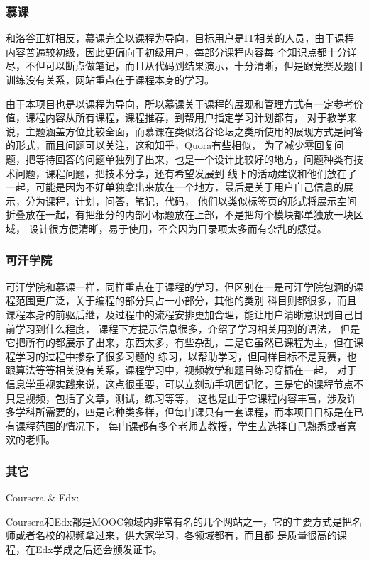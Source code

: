 \documentclass[UTF8,10pt,a4paper]{ctexart}
\begin{document}
     \subsubsection{慕课}
     和洛谷正好相反，慕课完全以课程为导向，目标用户是IT相关的人员，由于课程内容普遍较初级，因此更偏向于初级用户，每部分课程内容每
     个知识点都十分详尽，不但可以断点做笔记，而且从代码到结果演示，十分清晰，但是跟竞赛及题目训练没有关系，网站重点在于课程本身的学习。

     由于本项目也是以课程为导向，所以慕课关于课程的展现和管理方式有一定参考价值，课程内容从所有课程，课程推荐，到帮用户指定学习计划都有，
     对于教学来说，主题涵盖方位比较全面，而慕课在类似洛谷论坛之类所使用的展现方式是问答的形式，而且问题可以关注，这和知乎，Quora有些相似，
     为了减少零回复问题，把等待回答的问题单独列了出来，也是一个设计比较好的地方，问题种类有技术问题，课程问题，把技术分享，还有希望发展到
     线下的活动建议和他们放在了一起，可能是因为不好单独拿出来放在一个地方，最后是关于用户自己信息的展示，分为课程，计划，问答，笔记，代码，
     他们以类似标签页的形式将展示空间折叠放在一起，有把细分的内部小标题放在上部，不是把每个模块都单独放一块区域，
     设计很方便清晰，易于使用，不会因为目录项太多而有杂乱的感觉。

     \subsubsection{可汗学院}
     可汗学院和慕课一样，同样重点在于课程的学习，但区别在一是可汗学院包涵的课程范围更广泛，关于编程的部分只占一小部分，其他的类别 科目则都很多，而且课程本身的前驱后继，及过程中的流程安排更加合理，能让用户清晰意识到自己目前学习到什么程度，
     课程下方提示信息很多，介绍了学习相关用到的语法，
     但是它把所有的都展示了出来，东西太多，有些杂乱，二是它虽然已课程为主，但在课程学习的过程中掺杂了很多习题的 练习，以帮助学习，但同样目标不是竞赛，也跟算法等等相关没有关系，课程学习中，视频教学和题目练习穿插在一起，
     对于信息学重视实践来说，这点很重要，可以立刻动手巩固记忆，三是它的课程节点不只是视频，包括了文章，测试，练习等等，
     这也是由于它课程内容丰富，涉及许多学科所需要的，四是它种类多样，但每门课只有一套课程，而本项目目标是在已有课程范围的情况下，
     每门课都有多个老师去教授，学生去选择自己熟悉或者喜欢的老师。

     \subsubsection{其它}
     Coursera \& Edx:

     Coursera和Edx都是MOOC领域内非常有名的几个网站之一，它的主要方式是把名师或者名校的视频拿过来，供大家学习，各领域都有，而且都 是质量很高的课程，在Edx学成之后还会颁发证书。
\end{document}
